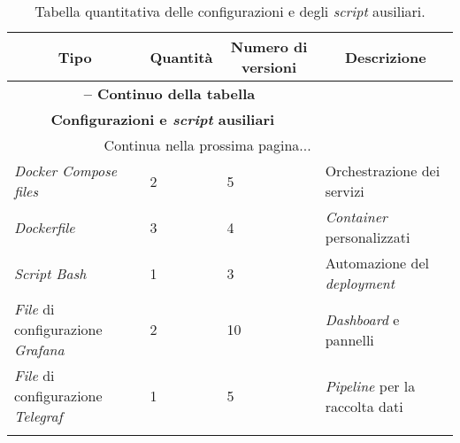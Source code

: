 \begin{center}
\begin{longtable}{|p{}|p{}|p{}|p{}|}
\hline
\multicolumn{1}{|c|}{\textbf{Tipo}} & 
\multicolumn{1}{c|}{\textbf{Quantità}} & 
\multicolumn{1}{|c|}{\textbf{Numero di versioni}} & 
\multicolumn{1}{c|}{\textbf{Descrizione}} \\ 
\hline
\endfirsthead

\multicolumn{3}{c}{{\bfseries \tablename\ \thetable{} -- Continuo della tabella}}\\
\hline
\multicolumn{3}{|c|}{\textbf{Configurazioni e \textit{script} ausiliari}} \\ \hline
\endhead

\hline \multicolumn{3}{|r|}{{Continua nella prossima pagina...}} \\ \hline
\endfoot

\endlastfoot

\textit{Docker Compose files} & 2 & 5 & Orchestrazione dei servizi \\ \hline
\textit{Dockerfile} & 3 & 4 & \textit{Container} personalizzati \\ \hline
\textit{Script Bash} & 1 & 3 & Automazione del \textit{deployment} \\ \hline
\textit{File} di configurazione \textit{Grafana} & 2 & 10 & \textit{Dashboard} e pannelli \\ \hline
\textit{File} di configurazione \textit{Telegraf} & 1 & 5 & \textit{Pipeline} per la raccolta dati \\ \hline

\caption{Tabella quantitativa delle configurazioni e degli \textit{script} ausiliari.}
\label{tab:configurazioni-script}
\end{longtable}
\end{center}

